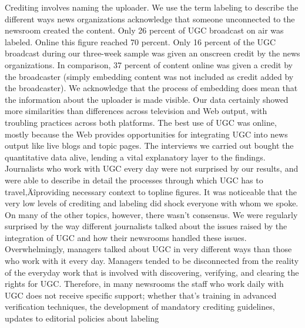 \documentclass[symmetric, notoc, nobib]{towcenter-book}
\begin{document}
Crediting involves naming the uploader. We use the term labeling to
describe the different ways news organizations acknowledge that someone
unconnected to the newsroom created the content. Only 26 percent of
UGC broadcast on air was labeled. Online this figure reached 70 percent.
Only 16 percent of the UGC broadcast during our three-week sample
was given an onscreen credit by the news organizations. In comparison,
37 percent of content online was given a credit by the broadcaster (simply
embedding content was not included as credit added by the broadcaster).
We acknowledge that the process of embedding does mean that the information
about the uploader is made visible.
Our data certainly showed more similarities than differences across television
and Web output, with troubling practices across both platforms. The
best use of UGC was online, mostly because the Web provides opportunities
for integrating UGC into news output like live blogs and topic pages.
The interviews we carried out bought the quantitative data alive, lending
a vital explanatory layer to the findings. Journalists who work with UGC
every day were not surprised by our results, and were able to describe in
detail the processes through which UGC has to travel‚Äîproviding necessary
context to topline figures. It was noticeable that the very low levels of
crediting and labeling did shock everyone with whom we spoke.
On many of the other topics, however, there wasn't consensus. We were regularly
surprised by the way different journalists talked about the issues raised
by the integration of UGC and how their newsrooms handled these issues.
Overwhelmingly, managers talked about UGC in very different ways than
those who work with it every day. Managers tended to be disconnected
from the reality of the everyday work that is involved with discovering, verifying,
and clearing the rights for UGC. Therefore, in many newsrooms the
staff who work daily with UGC does not receive specific support; whether
that's training in advanced verification techniques, the development of
mandatory crediting guidelines, updates to editorial policies about labeling
\end{document}
